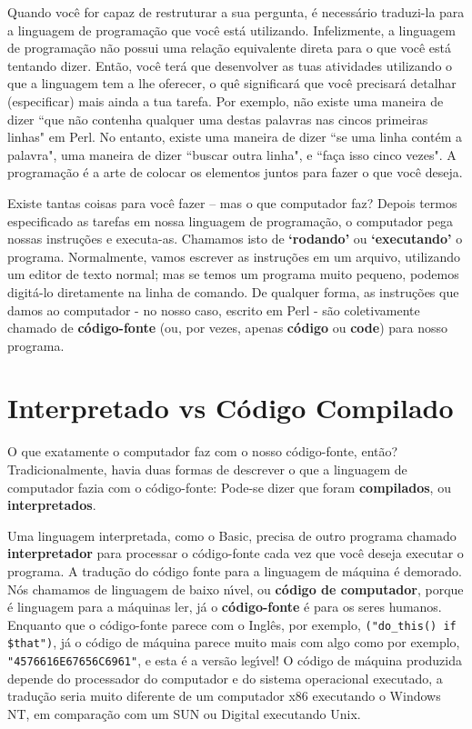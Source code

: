\documentclass[a4paper,12pt,twoside]{book}
\begin{document}
  \noindent Quando voc\^e for capaz de restruturar a sua pergunta, \'e 
  necess\'ario traduzi-la para a linguagem de programa\c{c}\~ao que 
  voc\^e est\'a utilizando. Infelizmente, a linguagem de programa\c{c}\~ao 
  n\~ao possui uma rela\c{c}\~ao equivalente direta para o que voc\^e est\'a 
  tentando dizer. Ent\~ao, voc\^e ter\'a que desenvolver as tuas atividades 
  utilizando o que a linguagem tem a lhe oferecer, o qu\^e significar\'a que 
  voc\^e precisar\'a detalhar (especificar) mais ainda a tua tarefa. Por 
  exemplo, n\~ao existe uma maneira de dizer ``que n\~ao contenha qualquer 
  uma destas palavras nas cincos primeiras linhas" em Perl. No entanto, 
  existe uma maneira de dizer ``se uma linha cont\'em a palavra", uma 
  maneira de dizer ``buscar outra linha", e ``fa\c{c}a isso cinco vezes". 
  A programa\c{c}\~ao \'e a arte de colocar os elementos juntos para 
  fazer o que voc\^e deseja.\medskip

  \noindent Existe tantas coisas para voc\^e fazer – mas o que computador 
  faz? Depois termos especificado as tarefas em nossa linguagem de programa\c{c}\~ao, 
  o computador pega nossas instru\c{c}\~oes e executa-as. Chamamos isto de 
  \textbf{`rodando'} ou \textbf{`executando'} o programa. Normalmente, vamos 
  escrever as instru\c{c}\~oes em um arquivo, utilizando um editor de texto 
  normal; mas se temos um programa muito pequeno, podemos digit\'a-lo diretamente na 
  linha de comando. De qualquer forma, as instru\c{c}\~oes que damos ao computador
  - no nosso caso, escrito em Perl - s\~ao coletivamente chamado de \textbf{c\'odigo-fonte} 
  (ou, por vezes, apenas \textbf{c\'odigo} ou \textbf{code}) para nosso programa.

\section{Interpretado vs C\'odigo Compilado}

\noindent O que exatamente o computador faz com o nosso c\'odigo-fonte, ent\~ao? Tradicionalmente, 
havia duas formas de descrever o que a linguagem de computador fazia com o c\'odigo-fonte: Pode-se 
dizer que foram \textbf{compilados}, ou \textbf{interpretados}.\medskip

\noindent Uma linguagem interpretada, como o Basic, precisa de outro programa chamado \textbf{interpretador} 
para processar o c\'odigo-fonte cada vez que voc\^e deseja executar o programa. A tradu\c{c}\~ao do c\'odigo 
fonte para a linguagem de m\'aquina \'e demorado. N\'os chamamos de linguagem de baixo n\'{\i}vel, 
ou \textbf{c\'odigo de computador}, porque \'e linguagem para a m\'aquinas ler, j\'a o \textbf{c\'odigo-fonte}
\'e para os seres humanos. Enquanto que o c\'odigo-fonte parece com o Ingl\^es, por exemplo, 
\texttt{("do\_this() if \$that")}, j\'a o c\'odigo de m\'aquina parece muito mais com algo como por exemplo, 
\texttt{"4576616E67656C6961"}, e esta \'e a vers\~ao leg\'{\i}vel! O c\'odigo de m\'aquina produzida depende 
do processador do computador e do sistema operacional executado, a tradu\c{c}\~ao seria muito diferente de um 
computador x86 executando o Windows NT, em compara\c{c}\~ao com um SUN ou Digital executando Unix.\medskip
\end{document}

